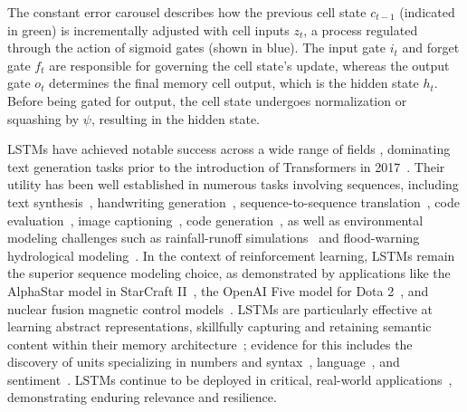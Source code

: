 The constant error carousel describes how the previous cell state $c_{t-1}$ (indicated in green) is incrementally adjusted with cell inputs $z_t$, a process regulated through the action of sigmoid gates (shown in blue). The input gate $i_t$ and forget gate $f_t$ are responsible for governing the cell state's update, whereas the output gate $o_t$ determines the final memory cell output, which is the hidden state $h_t$. Before being gated for output, the cell state undergoes normalization or squashing by $\psi$, resulting in the hidden state.

LSTMs have achieved notable success across a wide range of fields \citep{Hochreiter:01,Hochreiter:07,Schmidhuber:15}, dominating text generation tasks prior to the introduction of Transformers in 2017~\citep{Vaswani:17}. Their utility has been well established in numerous tasks involving sequences, including text synthesis~\citep{Graves:13,Karpathy:15blog}, handwriting generation~\citep{Graves:13}, sequence-to-sequence translation~\citep{Sutskever:14nips}, code evaluation~\citep{Zaremba:14arxiv}, image captioning~\citep{Karpathy:15,Hossain:19}, code generation~\citep{Karpathy:15blog}, as well as environmental modeling challenges such as rainfall-runoff simulations~\citep{Kratzert:18,Kratzert:19} and flood-warning hydrological modeling~\citep{Nearing:24}. In the context of reinforcement learning, LSTMs remain the superior sequence modeling choice, as demonstrated by applications like the AlphaStar model in StarCraft II~\citep{Vinyals:17short}, the OpenAI Five model for Dota 2~\citep{OpenAI:19}, and nuclear fusion magnetic control models~\citep{Degrave:22short}. LSTMs are particularly effective at learning abstract representations, skillfully capturing and retaining semantic content within their memory architecture~\citep{Karpathy:15blog}; evidence for this includes the discovery of units specializing in numbers and syntax~\citep{Lakretz:19}, language~\citep{Bau:19}, and sentiment~\citep{Radford:17arxiv}. LSTMs continue to be deployed in critical, real-world applications~\citep{Degrave:22short,Nearing:24}, demonstrating enduring relevance and resilience.

